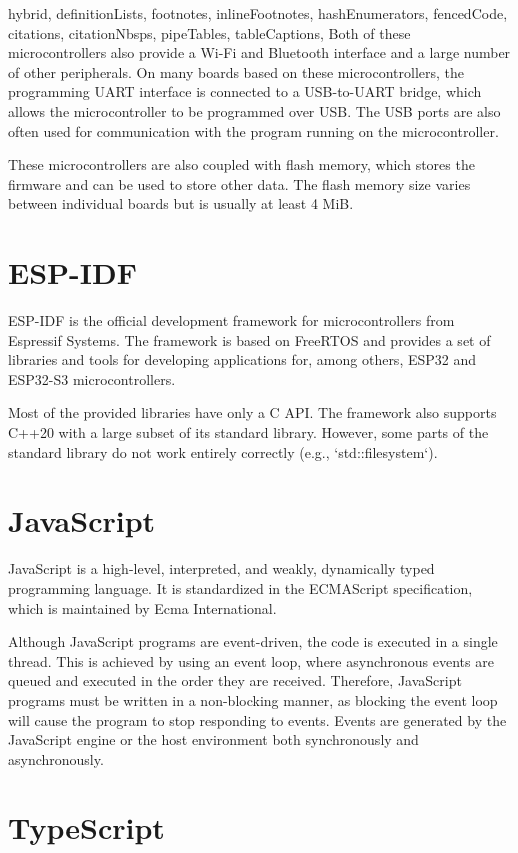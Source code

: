 \begin{markdown*}{%
  hybrid,
  definitionLists,
  footnotes,
  inlineFootnotes,
  hashEnumerators,
  fencedCode,
  citations,
  citationNbsps,
  pipeTables,
  tableCaptions,
}
Both of these microcontrollers also provide a Wi-Fi and Bluetooth interface and a large number of other peripherals. On many boards based on these microcontrollers, the programming UART interface is connected to a USB-to-UART bridge, which allows the microcontroller to be programmed over USB. The USB ports are also often used for communication with the program running on the microcontroller.

These microcontrollers are also coupled with flash memory, which stores the firmware and can be used to store other data. The flash memory size varies between individual boards but is usually at least 4 MiB.

\section{ESP-IDF}

ESP-IDF is the official development framework for microcontrollers from Espressif Systems. The framework is based on FreeRTOS and provides a set of libraries and tools for developing applications for, among others, ESP32 and ESP32-S3 microcontrollers.

Most of the provided libraries have only a C API. The framework also supports C++20 with a large subset of its standard library. However, some parts of the standard library do not work entirely correctly (e.g., `std::filesystem`).

\section{JavaScript}

JavaScript is a high-level, interpreted, and weakly, dynamically typed programming language. It is standardized in the ECMAScript specification, which is maintained by Ecma International.

Although JavaScript programs are event-driven, the code is executed in a single thread. This is achieved by using an event loop, where asynchronous events are queued and executed in the order they are received. Therefore, JavaScript programs must be written in a non-blocking manner, as blocking the event loop will cause the program to stop responding to events. Events are generated by the JavaScript engine or the host environment both synchronously and asynchronously.

\section{TypeScript}


\end{markdown*}

